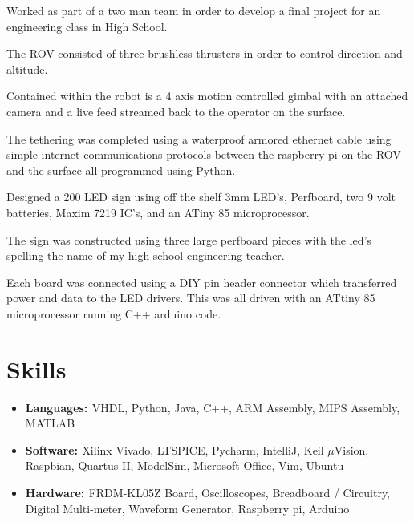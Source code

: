 \documentclass[a4paper]{comcv}
\begin{document}
\vspace{\topsep}
    \begin{tightlist}
        \item Worked as part of a two man team in order to develop a final project for an engineering class in High School.
        \item The ROV consisted of three brushless thrusters in order to control direction and altitude.
        \item Contained within the robot is a 4 axis motion controlled gimbal with an attached camera and a live feed streamed back to the operator on the surface.
        \item The tethering was completed using a waterproof armored ethernet cable using simple internet communications protocols between the raspberry pi on the ROV and the surface all programmed using Python.
\end{tightlist}


\vspace{\topsep}
    \begin{tightlist}
        \item Designed a 200 LED sign using off the shelf 3mm LED's, Perfboard, two 9 volt batteries, Maxim 7219 IC's, and an ATiny 85 microprocessor.
        \item The sign was constructed using three large perfboard pieces with the led's spelling the name of my high school engineering teacher.
        \item Each board was connected using a DIY pin header connector which transferred power and data to the LED drivers. This was all driven with an ATtiny 85 microprocessor running C++ arduino code.
    \end{tightlist}


\section{Skills}
\begin{itemize}
    \item {\bf{Languages: }}  {VHDL, Python, Java, C++, ARM Assembly, MIPS Assembly, MATLAB} 
    
    \item {\bf{Software: }} {Xilinx Vivado, LTSPICE, Pycharm, IntelliJ, Keil $\mu$Vision, Raspbian, Quartus II, ModelSim, Microsoft Office, Vim, Ubuntu}
    
    \item {\bf{Hardware: }}  {FRDM-KL05Z Board, Oscilloscopes, Breadboard / Circuitry, Digital Multi-meter, Waveform Generator, Raspberry pi, Arduino} 
\end{itemize}
\end{document}
